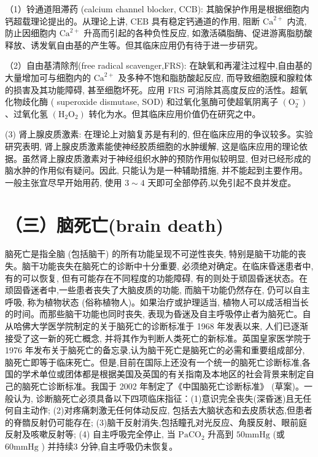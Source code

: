 \documentclass[10pt]{article}
\begin{document}
（1）铃通道阻滞药 (calcium channel blocker, CCB): 其脑保护作用是根据细胞内钙超载理论提出的。从理论上讲, $\mathrm{CEB}$ 具有稳定钙通道的作用, 阻断 $\mathrm{Ca}^{2+}$ 内流, 防止因细胞内 $\mathrm{Ca}^{2+}$ 升高而引起的各种负性反应, 如激活磷脂酶、促进游离脂肪酸释放、诱发氧自由基的产生等。但其临床应用仍有待于进一步研究。

（2）自由基清除剂(free radical scavenger,FRS): 在缺氧和再灌注过程中,自由基的大量增加可与细胞内的 $\mathrm{Ca}^{2+}$ 及多种不饱和脂肪酸起反应, 而导致细胞膜和腺粒体的损害及其功能障碍, 甚至细胞坏死。应用 FRS 可消除其高度反应的活性。超氧化物歧化酶 ( superoxide dismutase, SOD) 和过氧化氢酶可使超氧阴离子 $\left(\mathrm{O}_{2}^{-}\right)$、过氧化氢 $\left(\mathrm{H}_{2} \mathrm{O}_{2}\right)$ 转化为水。但其临床应用价值仍在研究之中。

(3) 肾上腺皮质激素: 在理论上对脑复苏是有利的, 但在临床应用的争议较多。实验研究表明, 肾上腺皮质激素能使神经胶质细胞的水肿缓解, 这是临床应用的理论依据。虽然肾上腺皮质激素对于神经组织水肿的预防作用似较明显, 但对已经形成的脑水肿的作用似有疑问。因此, 只能认为是一种辅助措施, 并不能起到主要作用。一般主张宜尽早开始用药, 使用 $3 \sim 4$ 天即可全部停药,以免引起不良并发症。

\section*{（三）脑死亡(brain death)}
脑死亡是指全脑 (包括脑干) 的所有功能呈现不可逆性丧失, 特别是脑干功能的丧失。脑干功能丧失在脑死亡的诊断中十分重要, 必须绝对确定。在临床昏迷患者中, 有的可以恢复, 但有可能存在不同程度的功能障碍, 有的则处于顽固昏迷状态。在顽固昏迷者中,一些患者丧失了大脑皮质的功能, 而脑干功能仍然存在, 仍可以自主呼吸, 称为植物状态 (俗称植物人)。如果治疗或护理适当, 植物人可以成活相当长的时间。而那些脑干功能也同时丧失, 表现为昏迷及自主呼吸停止者为脑死亡。自从哈佛大学医学院制定的关于脑死亡的诊断标准于 1968 年发表以来, 人们已逐渐接受了这一新的死亡概念, 并将其作为判断人类死亡的新标准。英国皇家医学院于 1976 年发布关于脑死亡的备忘录,认为脑干死亡是脑死亡的必需和重要组成部分, 脑死亡即等于临床死亡。但是,目前在国际上还没有一个统一的脑死亡诊断标准,各国的学术单位或团体都是根据美国及英国的有关指南及本地区的社会背景来制定自己的脑死亡诊断标准。我国于 2002 年制定了《中国脑死亡诊断标准》 (草案)。一般认为, 诊断脑死亡必须具备以下四项临床指征：(1)意识完全丧失(深昏迷)且无任何自主动作; (2)对疼痛刺激无任何体动反应, 包括去大脑状态和去皮质状态,但患者的脊䯝反射仍可能存在; (3)脑干反射消失,包括瞳孔对光反应、角膜反射、眼前庭反射及咳嗽反射等; (4) 自主呼吸完全停止, 当 $\mathrm{PaCO}_{2}$ 升高到 $50 \mathrm{mmHg}$ (或 $60 \mathrm{mmHg}$ ) 并持续3 分钟,自主呼吸仍未恢复。
\end{document}

